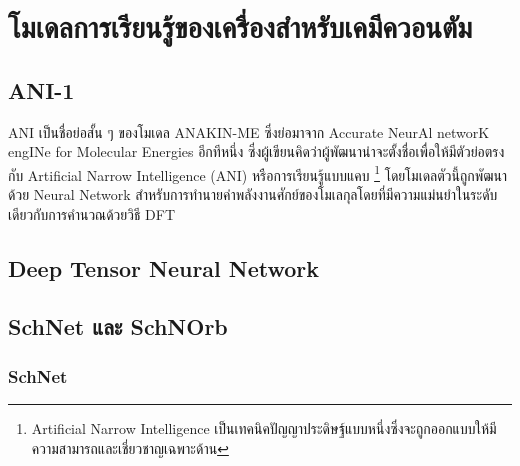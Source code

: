 

\chapter{โมเดลการเรียนรู้ของเครื่องสำหรับเคมีควอนตัม}
\label{ch:chem_ml}

\section{ANI-1}
\label{sec:ani1}

ANI เป็นชื่อย่อสั้น ๆ ของโมเดล ANAKIN-ME ซึ่งย่อมาจาก Accurate NeurAl networK engINe for Molecular Energies อีกทีหนึ่ง 
ซึ่งผู้เขียนคิดว่าผู้พัฒนาน่าจะตั้งชื่อเพื่อให้มีตัวย่อตรงกับ Artificial Narrow Intelligence (ANI) หรือการเรียนรู้แบบแคบ%
\footnote{Artificial Narrow Intelligence เป็นเทคนิคปัญญาประดิษฐ์แบบหนึ่งซึ่งจะถูกออกแบบให้มีความสามารถและเชี่ยวชาญเฉพาะด้าน}
โดยโมเดลตัวนี้ถูกพัฒนาด้วย Neural Network สำหรับการทำนายค่าพลังงานศักย์ของโมเลกุลโดยที่มีความแม่นยำในระดับเดียวกับการคำนวณด้วยวิธี 
DFT\autocite{smith2017}

\section{Deep Tensor Neural Network}
\label{sec:dtnn}

\autocite{schutt2017a}

\section{SchNet และ SchNOrb}
\label{sec:schnet_schnorb}

\subsection{SchNet}
\label{ssec:schnet}

